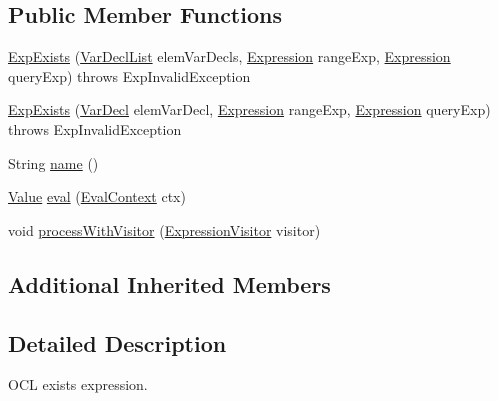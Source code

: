\subsection*{Public Member Functions}
\begin{DoxyCompactItemize}
\item 
\hyperlink{classorg_1_1tzi_1_1use_1_1uml_1_1ocl_1_1expr_1_1_exp_exists_a7cb2a2c815d8511bebac6c53bfde0abf}{Exp\-Exists} (\hyperlink{classorg_1_1tzi_1_1use_1_1uml_1_1ocl_1_1expr_1_1_var_decl_list}{Var\-Decl\-List} elem\-Var\-Decls, \hyperlink{classorg_1_1tzi_1_1use_1_1uml_1_1ocl_1_1expr_1_1_expression}{Expression} range\-Exp, \hyperlink{classorg_1_1tzi_1_1use_1_1uml_1_1ocl_1_1expr_1_1_expression}{Expression} query\-Exp)  throws Exp\-Invalid\-Exception     
\item 
\hyperlink{classorg_1_1tzi_1_1use_1_1uml_1_1ocl_1_1expr_1_1_exp_exists_ae742c4ecdbeafb73968a93ed59dbb90a}{Exp\-Exists} (\hyperlink{classorg_1_1tzi_1_1use_1_1uml_1_1ocl_1_1expr_1_1_var_decl}{Var\-Decl} elem\-Var\-Decl, \hyperlink{classorg_1_1tzi_1_1use_1_1uml_1_1ocl_1_1expr_1_1_expression}{Expression} range\-Exp, \hyperlink{classorg_1_1tzi_1_1use_1_1uml_1_1ocl_1_1expr_1_1_expression}{Expression} query\-Exp)  throws Exp\-Invalid\-Exception     
\item 
String \hyperlink{classorg_1_1tzi_1_1use_1_1uml_1_1ocl_1_1expr_1_1_exp_exists_a73b20f8ac53a9fafd413f4a690d70fcb}{name} ()
\item 
\hyperlink{classorg_1_1tzi_1_1use_1_1uml_1_1ocl_1_1value_1_1_value}{Value} \hyperlink{classorg_1_1tzi_1_1use_1_1uml_1_1ocl_1_1expr_1_1_exp_exists_ac8578c46a74848fe8a9abfc78d738cab}{eval} (\hyperlink{classorg_1_1tzi_1_1use_1_1uml_1_1ocl_1_1expr_1_1_eval_context}{Eval\-Context} ctx)
\item 
void \hyperlink{classorg_1_1tzi_1_1use_1_1uml_1_1ocl_1_1expr_1_1_exp_exists_a02fa882bab64bdb81f82deffadcd0093}{process\-With\-Visitor} (\hyperlink{interfaceorg_1_1tzi_1_1use_1_1uml_1_1ocl_1_1expr_1_1_expression_visitor}{Expression\-Visitor} visitor)
\end{DoxyCompactItemize}
\subsection*{Additional Inherited Members}


\subsection{Detailed Description}
O\-C\-L exists expression.

